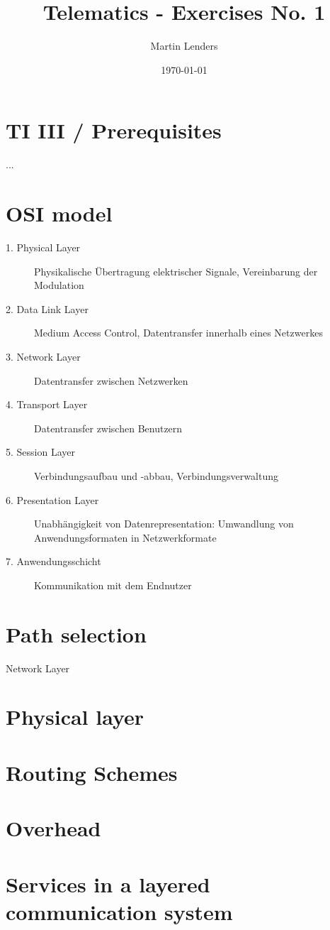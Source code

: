 \documentclass[a4paper,10pt]{scrartcl}
\title{Telematics - Exercises No. 1}
\author{Martin Lenders}
\date{\today}
\begin{document}
\maketitle
\setcounter{section}{-1}
\section{TI III / Prerequisites}
...
\section{OSI model}
\begin{description}
 \item[1. Physical Layer] Physikalische Übertragung elektrischer Signale, Vereinbarung der Modulation
 \item[2. Data Link Layer] Medium Access Control, Datentransfer innerhalb eines Netzwerkes
 \item[3. Network Layer] Datentransfer zwischen Netzwerken
 \item[4. Transport Layer] Datentransfer zwischen Benutzern
 \item[5. Session Layer] Verbindungsaufbau und -abbau, Verbindungsverwaltung
 \item[6. Presentation Layer] Unabhängigkeit von Datenrepresentation: Umwandlung von Anwendungsformaten in Netzwerkformate
 \item[7. Anwendungsschicht] Kommunikation mit dem Endnutzer
\end{description}

\section{Path selection}
Network Layer

\section{Physical layer}


\section{Routing Schemes}
\section{Overhead}
\section{Services in a layered communication system}
\end{document}
